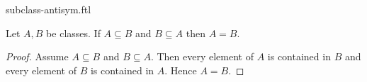 \documentclass{stex}
\begin{document}
\begin{smodule}{subclass-antisym.ftl}

  \begin{forthel}
    \begin{proposition}
      Let $A, B$ be classes.
      If $A \subseteq B$ and $B \subseteq A$ then $A = B$.
    \end{proposition}
    \begin{proof}
      Assume $A \subseteq B$ and $B \subseteq A$.
      Then every element of $A$ is contained in $B$ and every element of $B$ is contained in $A$.
      Hence $A = B$.
    \end{proof}
  \end{forthel}
\end{smodule}
\end{document}
